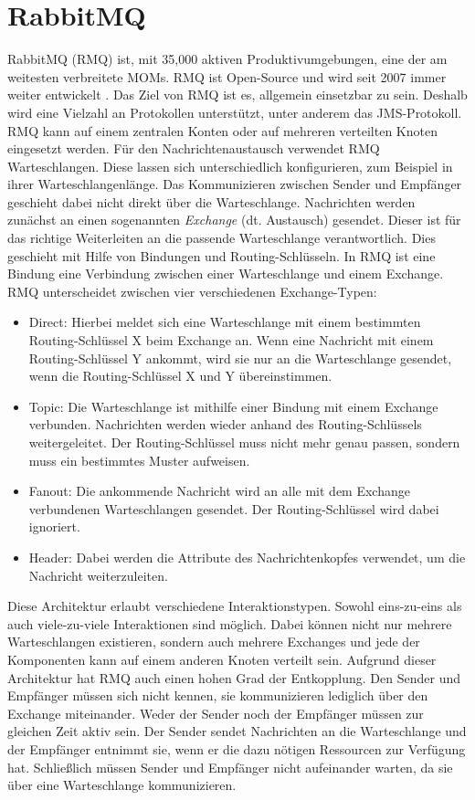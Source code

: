 \section{RabbitMQ}
\label{sec:rmq}
RabbitMQ (RMQ) ist, mit 35,000 aktiven Produktivumgebungen, eine der am weitesten verbreitete MOMs. 
RMQ ist Open-Source und wird seit 2007 immer weiter entwickelt \cite{rabbitmq}. Das Ziel von RMQ ist es, allgemein einsetzbar zu sein. Deshalb wird eine Vielzahl an Protokollen unterstützt, unter anderem das JMS-Protokoll. RMQ kann auf einem zentralen Konten oder auf mehreren verteilten Knoten eingesetzt werden. Für den Nachrichtenaustausch verwendet RMQ Warteschlangen. Diese lassen sich unterschiedlich konfigurieren, zum Beispiel in ihrer Warteschlangenlänge. Das Kommunizieren zwischen Sender und Empfänger geschieht dabei nicht direkt über die Warteschlange. Nachrichten werden zunächst an einen sogenannten \emph{Exchange} (dt. Austausch) gesendet. Dieser ist für das richtige Weiterleiten an die passende Warteschlange verantwortlich. Dies geschieht mit Hilfe von Bindungen und Routing-Schlüsseln. In RMQ ist eine Bindung eine Verbindung zwischen einer Warteschlange und einem Exchange. RMQ unterscheidet zwischen vier verschiedenen Exchange-Typen:
\begin{itemize}
    \item Direct: Hierbei meldet sich eine Warteschlange mit einem bestimmten Routing-Schlüssel X beim Exchange an. Wenn eine Nachricht mit einem Routing-Schlüssel Y ankommt, wird sie nur an die Warteschlange gesendet, wenn die Routing-Schlüssel X und Y übereinstimmen.
    \item Topic: Die Warteschlange ist mithilfe einer Bindung mit einem Exchange verbunden. Nachrichten werden wieder anhand des Routing-Schlüssels weitergeleitet. Der Routing-Schlüssel muss nicht mehr genau passen, sondern muss ein bestimmtes Muster aufweisen.
    \item Fanout: Die ankommende Nachricht wird an alle mit dem Exchange verbundenen Warteschlangen gesendet. Der Routing-Schlüssel wird dabei ignoriert.
    \item Header: Dabei werden die Attribute des Nachrichtenkopfes verwendet, um die Nachricht weiterzuleiten.
\end{itemize}
Diese Architektur erlaubt verschiedene Interaktionstypen. Sowohl eins-zu-eins als auch viele-zu-viele Interaktionen sind möglich. Dabei können nicht nur mehrere Warteschlangen existieren, sondern auch mehrere Exchanges und jede der Komponenten kann auf einem anderen Knoten verteilt sein. Aufgrund dieser Architektur hat RMQ auch einen hohen Grad der Entkopplung. Den Sender und Empfänger müssen sich nicht kennen, sie kommunizieren lediglich über den Exchange miteinander. Weder der Sender noch der Empfänger müssen zur gleichen Zeit aktiv sein. Der Sender sendet Nachrichten an die Warteschlange und der Empfänger entnimmt sie, wenn er die dazu nötigen Ressourcen zur Verfügung hat. Schließlich müssen Sender und Empfänger nicht aufeinander warten, da sie über eine Warteschlange kommunizieren.
